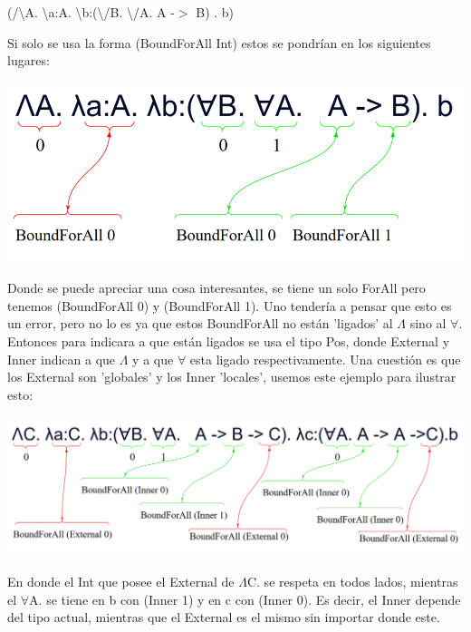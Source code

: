 \documentclass[12pt, titlepage, a4paper]{article}
\begin{document}
\begin{itemize}[label=$\bullet$]
{  \begin{center}
    (/\textbackslash A. \textbackslash a:A. \textbackslash b:(\textbackslash/B. \textbackslash/A. A -$>$ B) . b) 
  \end{center}

  Si solo se usa la forma (BoundForAll Int) estos se pondrían en los siguientes lugares:

  \begin{center}
    \includegraphics[width=.8\textwidth]{Imagenes/EjemploBoundForAllFunction.png}
  \end{center}

  Donde se puede apreciar una cosa interesantes, se tiene un solo ForAll pero tenemos (BoundForAll 0) y (BoundForAll 1). Uno tendería a 
  pensar que esto es un error, pero no lo es ya que estos BoundForAll no están 'ligados' al $\Lambda$ sino al $\forall$.\\

  Entonces para indicara a que están ligados se usa el tipo Pos, donde External y Inner indican a que $\Lambda$ y a que $\forall$ esta ligado respectivamente. Una 
  cuestión es que los External son 'globales' y los Inner 'locales', usemos este ejemplo para ilustrar esto:

  \begin{center}
    \includegraphics[width=1\textwidth]{Imagenes/EjemploBoundForAllFunction3.png}
  \end{center}

  En donde el Int que posee el External de $\Lambda$C. se respeta en todos lados, mientras el $\forall$A. se tiene en b con (Inner 1) y en c con (Inner 0). Es decir, 
  el Inner depende del tipo actual, mientras que el External es el mismo sin importar donde este.

}
\end{itemize}
\end{document}
